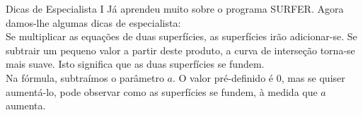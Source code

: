 \begin{surferPage}[Dicas I]{Dicas de Especialista I}
J\'a  aprendeu muito sobre o programa SURFER. Agora damos-lhe algumas dicas de especialista:\\
\vspace{0.3cm}
Se  multiplicar as equa\c c\~oes de duas superf\'icies, as superf\'icies ir\~ao adicionar-se. Se  subtrair um pequeno valor a partir deste produto, a curva de interse\c c\~ao torna-se mais suave. Isto significa que as duas superf\'icies se fundem.\\
\vspace{0.3cm}
Na f\'ormula,  subtra\'imos o par\^ametro $a$. O valor pr\'e-definido \'e 0, mas se quiser aument\'a-lo, pode observar como as superf\'icies se fundem, \`a medida que $a$ aumenta.
\end{surferPage}
